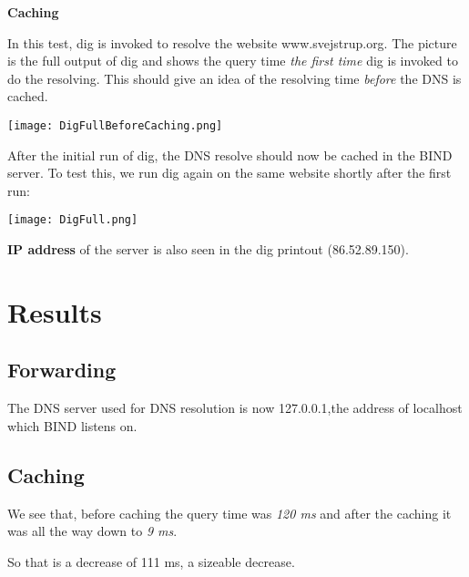 \textbf{Caching}

In this test, dig is invoked to resolve the website www.svejstrup.org.
The picture is the full output of dig and shows the query time \textit{the first time} dig is invoked to do the resolving. This should give an idea of the resolving time \textit{before} the DNS is cached.

\begin{center}
	\texttt{[image: DigFullBeforeCaching.png]}
\end{center}

After the initial run of dig, the DNS resolve should now be cached in the BIND server. To test this, we run dig again on the same website shortly after the first run:

\begin{center}
	\texttt{[image: DigFull.png]}
\end{center}

\textbf{IP address}
of the server is also seen in the dig printout (86.52.89.150).

\section{Results}
\subsection{Forwarding}
The DNS server used for DNS resolution is now 127.0.0.1,the address of localhost which BIND listens on.

\subsection{Caching}
We see that, before caching the query time was \textit{120 ms} and after the caching it was all the way down to \textit{9 ms}.

So that is a decrease of 111 ms, a sizeable decrease.



